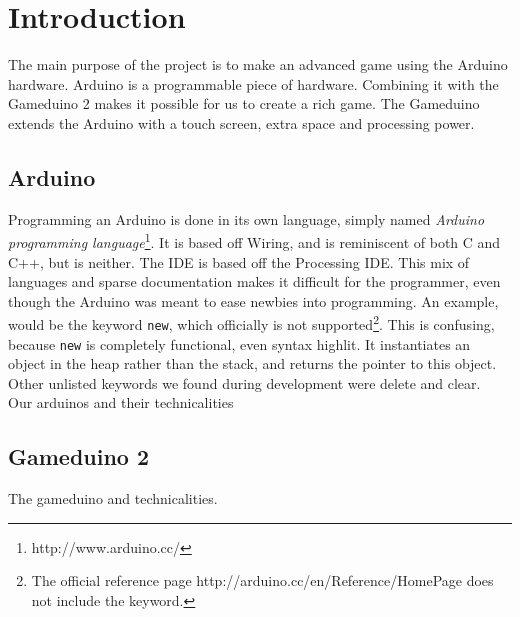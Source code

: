 \chapter{Introduction}
The main purpose of the project is to make an advanced game using the Arduino hardware.
Arduino is a programmable piece of hardware. Combining it with the  Gameduino 2 makes
it possible for us to create a rich game. The Gameduino extends the Arduino with a
touch screen, extra space and processing power.
\section{Arduino}
Programming an Arduino is done in its own language, simply named \emph{Arduino programming language}\footnote{http://www.arduino.cc/}. It is based off Wiring, and is reminiscent of both C and C++, but is neither. The IDE is based off the Processing IDE. This mix of languages and sparse documentation makes it difficult for the programmer, even though the Arduino was meant to ease newbies into programming. An example, would be the keyword {\tt new}, which officially is not supported\footnote{The official reference page http://arduino.cc/en/Reference/HomePage does not include the keyword.}. This is confusing, because {\tt new} is completely functional, even syntax highlit. It instantiates an object in the heap rather than the stack, and returns the pointer to this object. Other unlisted keywords we found during development were delete and clear.\\ %
Our arduinos and their technicalities
\section{Gameduino 2}
The gameduino and technicalities.